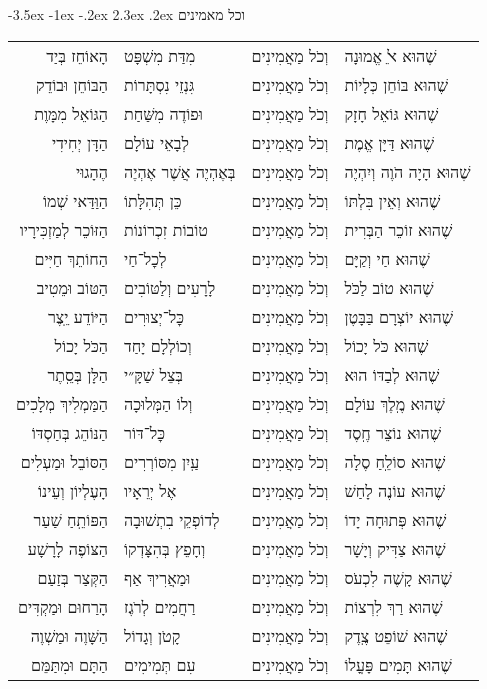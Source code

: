\documentclass[12pt,letterpaper]{siddur}
\makeatletter
\renewcommand\section{\setcounter{mishnah}{0}\@startsection {section}{1}{\z@}%
                                   {-3.5ex \@plus -1ex \@minus -.2ex}%
                                   {2.3ex \@plus.2ex}%
                                   {\normalfont\large}}
\makeatother
\begin{document}
\section{וכל מאמינים}
\begin{longtable}[r]{r l r l}
הָאוֹחֵז בְּיַד&מִדַּת מִשְׁפָּט&
וְכֹל מַאֲמִינִים&שֶׁהוּא ﭏֵ אֱמוּנָה\\
הַבּוֹחֵן וּבוֹדֵק&גִּנְזֵי נִסְתָּרוֹת&
וְכֹל מַאֲמִינִים&שֶׁהוּא בּוֹחֵן כְּלָיוֹת\\
הַגּוֹאֵל מִמָּוֶת&וּפוֹדֶה מִשַּׁחַת&
וְכֹל מַאֲמִינִים&שֶׁהוּא גּוֹאֵל חָזָק\\
הַדָּן יְחִידִי&לְבָאֵי עוֹלָם&
וְכֹל מַאֲמִינִים&שֶׁהוּא דַּיָּן אֱמֶת\\
הֶהָגוּי&בְּאֶהְיֶה אֲשֶׁר אֶהְיֶה&
וְכֹל מַאֲמִינִים&שֶׁהוּא הָיָה הֹוֶה וְיִהְיֶה\\
הַוַּדַּאי שְׁמוֹ&כֵּן תְּהִלָּתוֹ&
וְכֹל מַאֲמִינִים&שֶׁהוּא וְאֵין בִּלְתּוֹ\\
הַזּוֹכֵר לְמַזְכִּירָיו&טוֹבוֹת זִכְרוֹנוֹת&
וְכֹל מַאֲמִינִים&שֶׁהוּא זוֹכֵר הַבְּרִית\\
הַחוֹתֵךְ חַיִּים&לְכׇל־חַי&
וְכֹל מַאֲמִינִים&שֶׁהוּא חַי וְקַיָּם\\
הַטּוֹב וּמֵטִיב&לָרָעִים וְלַטּוֹבִים&
וְכֹל מַאֲמִינִים&שֶׁהוּא טוֹב לַכֹּל\\
הַיּוֹדֵע יֵֽצֶר&כׇּל־יְצוּרִים&
וְכֹל מַאֲמִינִים&שֶׁהוּא יוֹצְרָם בַּבָּטֶן\\
הַכֹּל יָכוֹל&וְכוֹלְלָם יָחַד&
וְכֹל מַאֲמִינִים&שֶׁהוּא כֹּל יָכוֹל\\
הַלָּן בְּסֵֽתֶר&בְּצֵל שַׁקָּ״י&
וְכֹל מַאֲמִינִים&שֶׁהוּא לְבַדּוֹ הוּא\\
הַמַּמְלִיךְ מְלָכִים&וְלוֹ הַמְּלוּכָה&
וְכֹל מַאֲמִינִים&שֶׁהוּא מֶֽלֶךְ עוֹלָם\\
הַנּוֹהֵג בְּחַסְדּוֹ&כׇּל־דּוֹר&
וְכֹל מַאֲמִינִים&שֶׁהוּא נוֹצֵר חֶֽסֶד\\
הַסּוֹבֵל וּמַעְלִים&עַֽיִן מִסּוֹרְרִים&
וְכֹל מַאֲמִינִים&שֶׁהוּא סוֹלֵֽחַ סֶלָה\\
הָעֶלְיוֹן וְעֵינוֹ&אֶל יְרֵאָיו&
וְכֹל מַאֲמִינִים&שֶׁהוּא עוֹנֶה לָחַשׁ\\
הַפּוֹתֵֽחַ שַׁעַר&לְדוֹפְקֵי בִתְשׁוּבָה&
וְכֹל מַאֲמִינִים&שֶׁהוּא פְּתוּחָה יָדוֹ\\
הַצּוֹפֶה לָרָשָׁע&וְחָפֵץ בְּהִצָּדְקוֹ&
וְכֹל מַאֲמִינִים&שֶׁהוּא צַדִּיק וְיָשָׁר\\
הַקְּצַר בְּזַעַם&וּמַאֲרִיךְ אַף&
וְכֹל מַאֲמִינִים&שֶׁהוּא קָשֶׁה לִכְעֹס\\
הָרַחוּם וּמַקְדִּים&רַחֲמִים לְרֹגֶז&
וְכֹל מַאֲמִינִים&שֶׁהוּא רַךְ לִרְצוֹת\\
הַשָּׁוֶה וּמַשְׁוֶה&קָטֹן וְגָדוֹל&
וְכֹל מַאֲמִינִים&שֶׁהוּא שׁוֹפֵט צֶֽדֶק\\
הַתָּם וּמִתַּמֵּם&עִם תְּמִימִים&
וְכֹל מַאֲמִינִים&שֶׁהוּא תָּמִים פָּעֳלוֹ
\end{longtable}
\end{document}
